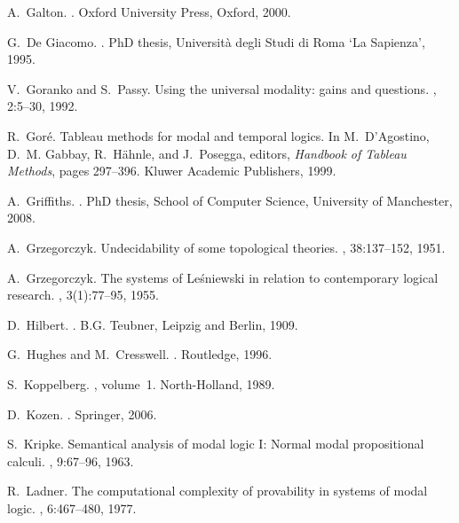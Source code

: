 \documentclass{LMCS}
\theoremstyle{plain}
\begin{document}
\begin{thebibliography}{10}
A.~Galton.
.
\newblock Oxford University Press, Oxford, 2000.

G.~De {G}iacomo.
.
\newblock PhD thesis, Universit\`a degli Studi di Roma `La Sapienza', 1995.

V.~Goranko and S.~Passy.
\newblock Using the universal modality: gains and questions.
, 2:5--30, 1992.

R.~Gor{\'e}.
\newblock Tableau methods for modal and temporal logics.
\newblock In M.~D'Agostino, D.~M. Gabbay, R.~H{\"a}hnle, and J.~Posegga,
  editors, {\em Handbook of Tableau Methods}, pages 297--396. Kluwer Academic
  Publishers, 1999.

A.~Griffiths.
.
\newblock PhD thesis, School of Computer Science, University of Manchester,
  2008.

A.~Grzegorczyk.
\newblock Undecidability of some topological theories.
, 38:137--152, 1951.

A.~Grzegorczyk.
\newblock The systems of {L}e{\'{s}}niewski in relation to contemporary logical
  research.
, 3(1):77--95, 1955.

D.~Hilbert.
.
\newblock B.G. Teubner, Leipzig and Berlin, 1909.

G.~Hughes and M.~Cresswell.
.
\newblock Routledge, 1996.

S.~Koppelberg.
, volume~1.
\newblock North-Holland, 1989.

D.~Kozen.
.
\newblock Springer, 2006.

S.~Kripke.
\newblock Semantical analysis of modal logic {I}: Normal modal propositional
  calculi.
, 9:67--96, 1963.

R.~Ladner.
\newblock The computational complexity of provability in systems of modal
  logic.
, 6:467--480, 1977.


\end{thebibliography}
\end{document}

